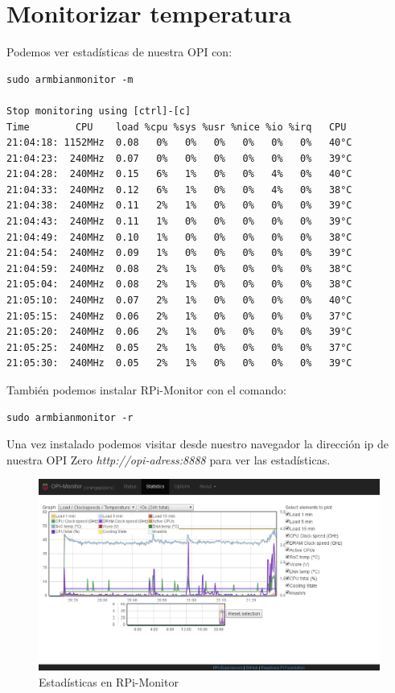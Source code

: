 \documentclass[12pt,spanish,]{scrartcl}
\begin{document}
\section{Monitorizar temperatura}\label{monitorizar-temperatura}

Podemos ver estadísticas de nuestra OPI con:

\begin{verbatim}
sudo armbianmonitor -m

Stop monitoring using [ctrl]-[c]
Time        CPU    load %cpu %sys %usr %nice %io %irq   CPU
21:04:18: 1152MHz  0.08   0%   0%   0%   0%   0%   0%   40°C
21:04:23:  240MHz  0.07   0%   0%   0%   0%   0%   0%   39°C
21:04:28:  240MHz  0.15   6%   1%   0%   0%   4%   0%   40°C
21:04:33:  240MHz  0.12   6%   1%   0%   0%   4%   0%   38°C
21:04:38:  240MHz  0.11   2%   1%   0%   0%   0%   0%   39°C
21:04:43:  240MHz  0.11   1%   0%   0%   0%   0%   0%   39°C
21:04:49:  240MHz  0.10   1%   0%   0%   0%   0%   0%   38°C
21:04:54:  240MHz  0.09   1%   0%   0%   0%   0%   0%   39°C
21:04:59:  240MHz  0.08   2%   1%   0%   0%   0%   0%   38°C
21:05:04:  240MHz  0.08   2%   1%   0%   0%   0%   0%   38°C
21:05:10:  240MHz  0.07   2%   1%   0%   0%   0%   0%   40°C
21:05:15:  240MHz  0.06   2%   1%   0%   0%   0%   0%   37°C
21:05:20:  240MHz  0.06   2%   1%   0%   0%   0%   0%   39°C
21:05:25:  240MHz  0.05   2%   1%   0%   0%   0%   0%   37°C
21:05:30:  240MHz  0.05   2%   1%   0%   0%   0%   0%   39°C
\end{verbatim}

También podemos instalar RPi-Monitor con el comando:

\begin{verbatim}
sudo armbianmonitor -r
\end{verbatim}

Una vez instalado podemos visitar desde nuestro navegador la dirección
ip de nuestra OPI Zero \emph{http://opi-adress:8888} para ver las
estadísticas.

\begin{figure}[htbp]
\centering
\includegraphics{src/img/rpimonitor.png}
\caption{Estadísticas en RPi-Monitor}
\end{figure}
\end{document}
